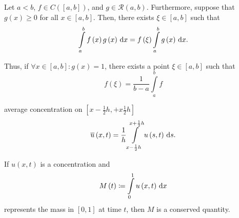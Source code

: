 \begin{frame}
    \begin{theorem}
        Let $a<b$, $f\in C\left(\left[a,b\right]\right)$, and $g\in\mathcal{R}\left(a,b\right)$.
        Furthermore, suppose that $g\left(x\right)\geq0$ for all $x\in\left[a,b\right]$.
        Then, there exists $\xi\in\left[a,b\right]$ such that
        \begin{equation*}
            \int\limits_{a}^{b}
            f\left(x\right)
            g\left(x\right)
            \dl x=
            f\left(\xi\right)
            \int\limits_{a}^{b}
            g\left(x\right)
            \dl x.
        \end{equation*}

        Thus, if $\forall x\in\left[a,b\right]:g\left(x\right)=1$, there exists
        a point $\xi\in\left[a,b\right]$ such that
        \begin{equation*}
            f\left(\xi\right)=
            \dfrac{1}{b-a}
            \int\limits_{a}^{b}
            f
        \end{equation*}
    \end{theorem}

    \begin{definition}
        average concentration on
        \begin{math}
            \left[
                x-\frac{1}{2}h,
                +x\frac{1}{2}h
                \right]
        \end{math}
        \begin{equation*}
            \overline{u}\left(x,t\right)=
            \dfrac{1}{h}
            \int\limits_{x-\frac{1}{2}h}^{x+\frac{1}{2}h}
            u\left(s,t\right)
            \dl s.
        \end{equation*}
    \end{definition}

    \begin{theorem}
        If $u\left(x,t\right)$ is a concentration and
        \begin{equation*}
            M\left(t\right)\coloneqq
            \int\limits_{0}^{1}
            u\left(x,t\right)
            \dl x
        \end{equation*}
        represents the mass in $\left[0,1\right]$ at time $t$, then
        $M$ is a conserved quantity.
    \end{theorem}


\end{frame}
